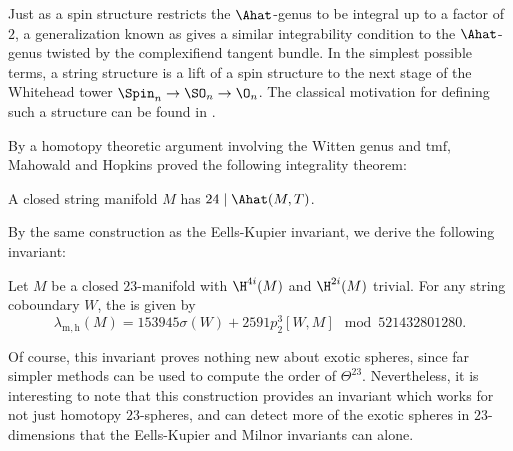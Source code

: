 Just as a spin structure restricts the $\Ahat$-genus to be integral up to a factor of $2$, a generalization known as  gives a similar integrability condition to the $\Ahat$-genus twisted by the complexifiend tangent bundle. In the simplest possible terms, a string structure is a lift of a spin structure to the next stage of the Whitehead tower $\Spin_n \to \SO_n \to \O_n$. The classical motivation for defining such a structure can be found in \cite{witten1988string}.

By a homotopy theoretic argument involving the Witten genus and $\mathrm{tmf}$, Mahowald and Hopkins proved the following integrality theorem:
\begin{theorem}
	A closed string manifold $M$ has $24\mid \Ahat(M,T)$.
\end{theorem}

By the same construction as the Eells-Kupier invariant, we derive the following invariant:

\begin{corollary}
	Let $M$ be a closed $23$-manifold with $\H^{4i}(M)$ and $\H^{2i}(M)$ trivial. For any string coboundary $W$, the  is given by
	\[
		\lambda_{\mathrm{m,h}}(M) = 153945\sigma(W) + 2591p_2^3[W,M]\mod 521432801280.
	\]
\end{corollary}

Of course, this invariant proves nothing new about exotic spheres, since far simpler methods can be used to compute the order of $\Theta^{23}$. Nevertheless, it is interesting to note that this construction provides an invariant which works for not just homotopy $23$-spheres, and can detect more of the exotic spheres in $23$-dimensions that the Eells-Kupier and Milnor invariants can alone.


